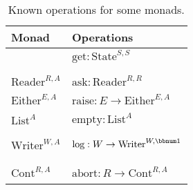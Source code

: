 \begin{table}[H]
\begin{centering}
\begin{tabular}{|>{\centering}m{1.6cm}|>{\centering}m{8.5cm}|}
\hline 
\textbf{\small{}Monad} & \textbf{\small{}Operations}\tabularnewline
\hline 
\hline 
{\small{}$\text{State}^{S,A}$} & {\small{}$\text{get}:\text{State}^{S,S}$}\\
{\small{}$\text{set}:S\rightarrow\text{State}^{S,\bbnum 1}$}\\
{\small{}$\text{update}:(S\rightarrow S)\rightarrow\text{State}^{S,\bbnum 1}$}\tabularnewline
\hline 
{\small{}$\text{Reader}^{R,A}$} & {\small{}$\text{ask}:\text{Reader}^{R,R}$}\\
{\small{}$\text{local}:R\times\text{Reader}^{R,A}\rightarrow\text{Reader}^{R,A}$}\tabularnewline
\hline 
{\small{}$\text{Either}^{E,A}$} & {\small{}$\text{raise}:E\rightarrow\text{Either}^{E,A}$}\\
{\small{}$\text{handle}:(E\rightarrow\text{Either}^{E,A})\times\text{Either}^{E,A}\rightarrow\text{Either}^{E,A}$}\tabularnewline
\hline 
{\small{}$\text{List}^{A}$} & {\small{}$\text{empty}:\text{List}^{A}$}\\
{\small{}$\text{append}:\text{List}^{A}\times\text{List}^{A}\rightarrow\text{List}^{A}$}\\
{\small{}$\text{filter}:\text{List}^{A}\times(A\rightarrow\bbnum 2)\rightarrow\text{List}^{A}$}\tabularnewline
\hline 
{\small{}$\text{Writer}^{W,A}$} & {\small{}$\text{log}:W\rightarrow\text{Writer}^{W,\bbnum 1}$}\\
{\small{}$\text{collect}:\text{Writer}^{W,A}\rightarrow\text{Writer}^{W,A\times W}$}\\
{\small{}$\text{process}:\text{Writer}^{W,A\times(W\rightarrow W)}\rightarrow\text{Writer}^{W,A}$}\\
{\small{}$\text{clear}:\text{Writer}^{W,A}\rightarrow\text{Writer}^{W,A}$}\tabularnewline
\hline 
{\small{}$\text{Cont}^{R,A}$} & {\small{}$\text{abort}:R\rightarrow\text{Cont}^{R,A}$}\\
{\small{}$\text{callcc}:((A\rightarrow\text{Cont}^{R,B})\rightarrow\text{Cont}^{R,A})\rightarrow\text{Cont}^{R,A}$}\tabularnewline
\hline 
\end{tabular}
\par\end{centering}
\caption{Known operations for some monads.\label{tab:effectful-operations-for-some-monads}}

\end{table}


